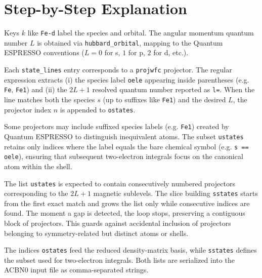 \documentclass[11pt]{article}
\begin{document}
\section{Step-by-Step Explanation}
\begin{description}[leftmargin=0pt,labelindent=1.5em]
  \item[Iteration over shells:] Keys \(k\) like \texttt{Fe-d} label the species and orbital. The angular momentum quantum number \(L\) is obtained via \verb|hubbard_orbital|, mapping to the Quantum ESPRESSO conventions (\(L=0\) for s, \(1\) for p, \(2\) for d, etc.).
  \item[Projector scanning:] Each \texttt{state\_lines} entry corresponds to a \texttt{projwfc} projector. The regular expression extracts (i) the species label \verb|oele| appearing inside parentheses (e.g.	\texttt{Fe}, \texttt{Fe1}) and (ii) the \(2L\!+\!1\) resolved quantum number reported as \verb|l=|. When the line matches both the species \(s\) (up to suffixes like \texttt{Fe1}) and the desired \(L\), the projector index \(n\) is appended to \verb|ostates|.
  \item[Exact species matches:] Some projectors may include suffixed species labels (e.g.	\texttt{Fe1}) created by Quantum ESPRESSO to distinguish inequivalent atoms. The subset \verb|ustates| retains only indices where the label equals the bare chemical symbol (e.g.	\verb|s == oele|), ensuring that subsequent two-electron integrals focus on the canonical atom within the shell.
  \item[Contiguity enforcement:] The list \verb|ustates| is expected to contain consecutively numbered projectors corresponding to the \(2L\!+\!1\) magnetic sublevels. The slice building \verb|sstates| starts from the first exact match and grows the list only while consecutive indices are found. The moment a gap is detected, the loop stops, preserving a contiguous block of projectors. This guards against accidental inclusion of projectors belonging to symmetry-related but distinct atoms or shells.
  \item[Outputs:] The indices \verb|ostates| feed the reduced density-matrix basis, while \verb|sstates| defines the subset used for two-electron integrals. Both lists are serialized into the ACBN0 input file as comma-separated strings.
\end{description}
\end{document}
